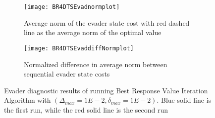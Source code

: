 \begin{figure}[h!]
\centering
\begin{subfigure}[t]{0.475\textwidth}
	\centering
	\texttt{[image: BR4DTSEvadnormplot]}
	\caption{Average norm of the evader state cost with red dashed line as the average norm of the optimal value}
	\label{BR4DTSEnp}
\end{subfigure}
\hfill
\begin{subfigure}[t]{0.475\textwidth}
	\centering
	\texttt{[image: BR4DTSEvaddiffNormplot]}
	\caption{Normalized difference in average norm between sequential evader state costs}
	\label{BR4DTSEdnp}
\end{subfigure}
\caption{Evader diagnostic results of running Best Response Value Iteration Algorithm with $(\Delta_{max} = 1E-2,\delta_{max} = 1E-2)$. Blue solid line is the first run, while the red solid line is the second run}
\label{BR4DTSEdiag}
\end{figure}

